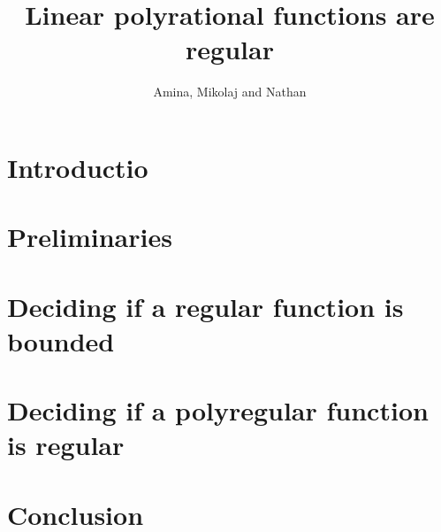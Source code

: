 \documentclass{article}
\begin{document}
 \title{Linear polyrational functions are regular}
 \author{Amina, Mikolaj and Nathan}
 \maketitle


\section{Introductio}
\section{Preliminaries}

\section{Deciding if a regular function is bounded}

\section{Deciding if a polyregular function is regular}

\section{Conclusion}




\end{document}

